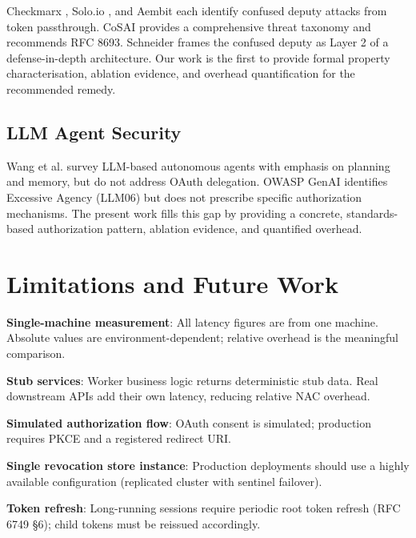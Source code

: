 \documentclass[journal]{IEEEtran}
\begin{document}
Checkmarx \cite{checkmarx_mcp}, Solo.io \cite{solo_mcp}, and Aembit
\cite{aembit_mcp} each identify confused deputy attacks from token passthrough.
CoSAI \cite{cosai_mcp} provides a comprehensive threat taxonomy and recommends
RFC 8693. Schneider \cite{schneider_mcp} frames the confused deputy as Layer 2
of a defense-in-depth architecture. Our work is the first to provide formal
property characterisation, ablation evidence, and overhead quantification for the
recommended remedy.

\subsection{LLM Agent Security}

Wang et al. \cite{wang2024survey} survey LLM-based autonomous agents with
emphasis on planning and memory, but do not address OAuth delegation. OWASP GenAI
\cite{owasp_genai} identifies Excessive Agency (LLM06) but does not prescribe
specific authorization mechanisms. The present work fills this gap by providing
a concrete, standards-based authorization pattern, ablation evidence, and
quantified overhead.


\section{Limitations and Future Work}
\label{sec:limitations}

\textbf{Single-machine measurement}: All latency figures are from one machine.
Absolute values are environment-dependent; relative overhead is the meaningful
comparison.

\textbf{Stub services}: Worker business logic returns deterministic stub data.
Real downstream APIs add their own latency, reducing relative NAC overhead.

\textbf{Simulated authorization flow}: OAuth consent is simulated; production
requires PKCE \cite{rfc7636} and a registered redirect URI.

\textbf{Single revocation store instance}: Production deployments should use a
highly available configuration (replicated cluster with sentinel failover).

\textbf{Token refresh}: Long-running sessions require periodic root token refresh
(RFC 6749 §6); child tokens must be reissued accordingly.
\end{document}
